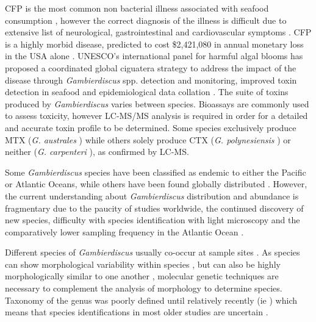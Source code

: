 \documentclass[12pt]{article}
\begin{document}
CFP is the most common non bacterial illness associated with seafood consumption \citep{friedman2008ciguatera}, however the correct diagnosis of the illness is difficult due to extensive list of neurological, gastrointestinal and cardiovascular symptoms \citep{sims1987theoretical}. CFP is a highly morbid disease, predicted to cost \$2,421,080 in annual monetary loss in the USA alone \citep{minor2014per}.  UNESCO's international panel for harmful algal blooms has proposed a coordinated global ciguatera strategy to address the impact of the disease through \emph{Gambierdiscus} spp. detection and monitoring, improved toxin detection in seafood and epidemiological data collation \citep{globalcig}.
The suite of toxins produced by \emph{Gambierdiscus} varies between species. Bioassays are commonly used to assess toxicity, however LC-MS/MS analysis is required in order for a detailed and accurate toxin profile to be determined\citep{diogened2014chemistry}. Some species exclusively produce MTX (\emph{G. australes} \citep{rhodes2014production}) while others solely produce CTX (\emph{G. polynesiensis} \citep{rhodes2014production}) or neither (\emph{G. carpenteri} \citep{kohli2014high}), as confirmed by LC-MS. 

Some \emph{Gambierdiscus} species have been classified as endemic to either the Pacific or Atlantic Oceans, while others have been found globally distributed \citep{berdalet2012global,litaker2010global}. %
However, the current understanding about \emph{Gambierdiscus} distribution and abundance is fragmentary due to the paucity of studies worldwide, the continued discovery of new species, difficulty with species identification with light microscopy and the comparatively lower sampling frequency in the Atlantic Ocean \citep{berdalet2012global,nishimura2014morphology}. 

Different species of \emph{Gambierdiscus} usually co-occur at sample sites \citep{litaker2010global}. As species can show morphological variability within species \citep{bravo2014cellular}, but can also be highly morphologically similar to one another \citep{kohli2014high}, molecular genetic techniques are necessary to complement the analysis of morphology to determine species. Taxonomy of the genus was poorly defined until relatively recently (ie \citep{litaker2009taxonomy,richlen2008phylogeography}) which means that species identifications in most older studies are uncertain \citep{berdalet2012global}. %
\end{document}
